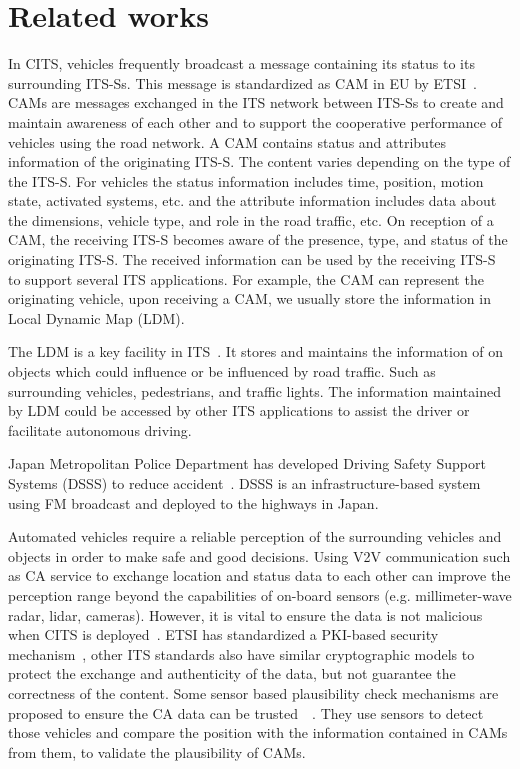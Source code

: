 \section{Related works} \label{sec:related_works}

In CITS, vehicles frequently broadcast a message containing its status to its surrounding ITS-Ss.
This message is standardized as CAM  in EU by ETSI~\cite{etsi2014302}.
CAMs are messages exchanged in the ITS network between ITS-Ss to create and maintain awareness of each other
and to support the cooperative performance of vehicles using the road network.
A CAM contains status and attributes information of the originating ITS-S.
The content varies depending on the type of the ITS-S.
For vehicles the status information includes time, position, motion state, activated systems,
etc. and the attribute information includes data about the dimensions,
vehicle type, and role in the road traffic, etc.
On reception of a CAM, the receiving ITS-S becomes aware of the presence, type, and status of the originating ITS-S.
The received information can be used by the receiving ITS-S to support several ITS applications.
For example, the CAM can represent the originating vehicle, upon receiving a CAM,
we usually store the information in Local Dynamic Map (LDM).

The LDM is a key facility in ITS~\cite{etsi2014302895}.
It stores and maintains the information of on objects which could influence or be influenced by road traffic.
Such as surrounding vehicles, pedestrians, and traffic lights.
The information maintained by LDM could be accessed by other ITS applications to assist the driver or facilitate autonomous driving.

Japan Metropolitan Police Department has developed Driving Safety Support Systems (DSSS) to reduce accident~\cite{yamamoto2006aichi}.
DSSS is an infrastructure-based system using FM broadcast and deployed to the highways in Japan.

Automated vehicles require a reliable perception of the surrounding vehicles and objects in order to make safe and good decisions.
Using V2V communication such as CA service to exchange location and status data to
each other can improve the perception range beyond the capabilities of on-board sensors (e.g. millimeter-wave radar, lidar, cameras).
However, it is vital to ensure the data is not malicious when CITS is deployed~\cite{amoozadeh2015security}.
ETSI has standardized a PKI-based security mechanism~\cite{etsi2013103},
other ITS standards also have similar cryptographic models to protect the exchange and authenticity of the data,
but not guarantee the correctness of the content.
Some sensor based plausibility check mechanisms are proposed to ensure the CA data can be trusted~\cite{obst2014multi}~\cite{dhurandher2014vehicular}.
They use sensors to detect those vehicles and compare the position with the information contained in CAMs from them, to validate the plausibility of CAMs.

